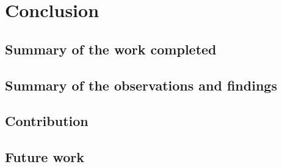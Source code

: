 
\section{Conclusion}

\subsection{Summary of the work completed}

\subsection{Summary of the observations and findings}

\subsection{Contribution}

\subsection{Future work}

\newpage



